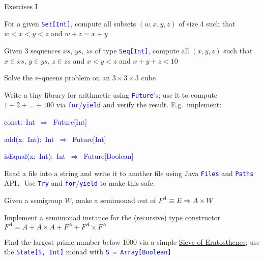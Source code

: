 \documentclass[english]{beamer}
\newenvironment{lyxcode}
   {\par\begin{list}{}{
     \setlength{\rightmargin}{\leftmargin}
     \setlength{\listparindent}{0pt}%
     \raggedright
     \setlength{\itemsep}{0pt}
     \setlength{\parsep}{0pt}
     \normalfont\ttfamily}%
    \def\{{\char`\{}
    \def\}{\char`\}}
    \def\textasciitilde{\char`\~}
    \item[]}
   {\end{list}}
\begin{document}
\begin{frame}{Exercises I}
\begin{enumerate}
\item For a given \texttt{\textcolor{blue}{\footnotesize{}Set{[}Int{]}}},
compute all subsets $\left(w,x,y,z\right)$ of size 4 such that $w<x<y<z$
and $w+z=x+y$
\item Given 3 sequences $xs$, $ys$, $zs$ of type \texttt{\textcolor{blue}{\footnotesize{}Seq{[}Int{]}}},
compute all $\left(x,y,z\right)$ such that $x\in xs$, $y\in ys$,
$z\in zs$ and $x<y<z$ and $x+y+z<10$
\item Solve the $n$-queens problem on an $3\times3\times3$ cube
\item Write a tiny library for arithmetic using \texttt{\textcolor{blue}{\footnotesize{}Future}}'s;
use it to compute $1+2+...+100$ via \texttt{\textcolor{blue}{\footnotesize{}for}}/\texttt{\textcolor{blue}{\footnotesize{}yield}}
and verify the result. E.g.\ implement: 
\begin{lyxcode}
\textcolor{blue}{\footnotesize{}const:~Int~$\Rightarrow$~Future{[}Int{]}}{\footnotesize \par}

\textcolor{blue}{\footnotesize{}add(x:~Int):~Int~$\Rightarrow$~Future{[}Int{]}}{\footnotesize \par}

\textcolor{blue}{\footnotesize{}isEqual(x:~Int):~Int~$\Rightarrow$~Future{[}Boolean{]}~}{\footnotesize \par}
\end{lyxcode}
\item Read a file into a string and write it to another file using Java
\texttt{\textcolor{blue}{\footnotesize{}Files}} and \texttt{\textcolor{blue}{\footnotesize{}Paths}}
API\texttt{\textcolor{blue}{\footnotesize{}. }}Use \texttt{\textcolor{blue}{\footnotesize{}Try}}
and \texttt{\textcolor{blue}{\footnotesize{}for}}/\texttt{\textcolor{blue}{\footnotesize{}yield}}
to make this safe.
\item Given a semigroup $W$, make a semimonad out of $F^{A}\equiv E\Rightarrow A\times W$ 
\item Implement a semimonad instance for the (recursive) type constructor
$F^{A}=A+A\times A+F^{A}+F^{A}\times F^{A}$
\item Find the largest prime number below 1000 via a simple \href{https://en.wikipedia.org/wiki/Sieve_of_Eratosthenes}{Sieve of Eratosthenes};
use the \texttt{\textcolor{blue}{\footnotesize{}State{[}S, Int{]}}}
monad with \texttt{\textcolor{blue}{\footnotesize{}S = Array{[}Boolean{]}}} 
\end{enumerate}
\end{frame}
\end{document}
